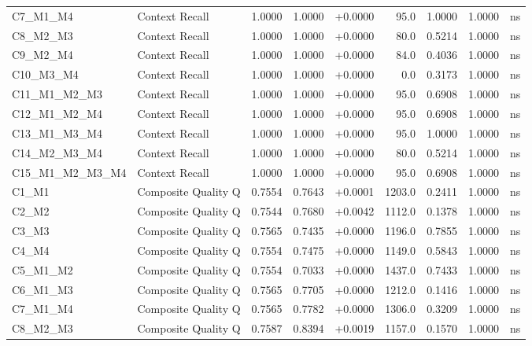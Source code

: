 \begin{table}[p]
\begin{tabular*}{\textwidth}{@{\extracolsep{\fill}} l l r r r r r r c @{}}
\addlinespace
C7\_M1\_M4      & Context Recall       & 1.0000 & 1.0000 & +0.0000 & 95.0 & 1.0000 & 1.0000 & ns \\
\addlinespace
C8\_M2\_M3      & Context Recall       & 1.0000 & 1.0000 & +0.0000 & 80.0 & 0.5214 & 1.0000 & ns \\
\addlinespace
C9\_M2\_M4      & Context Recall       & 1.0000 & 1.0000 & +0.0000 & 84.0 & 0.4036 & 1.0000 & ns \\
\addlinespace
C10\_M3\_M4     & Context Recall       & 1.0000 & 1.0000 & +0.0000 & 0.0 & 0.3173 & 1.0000 & ns \\
\addlinespace
C11\_M1\_M2\_M3 & Context Recall       & 1.0000 & 1.0000 & +0.0000 & 95.0 & 0.6908 & 1.0000 & ns \\
\addlinespace
C12\_M1\_M2\_M4 & Context Recall       & 1.0000 & 1.0000 & +0.0000 & 95.0 & 0.6908 & 1.0000 & ns \\
\addlinespace
C13\_M1\_M3\_M4 & Context Recall       & 1.0000 & 1.0000 & +0.0000 & 95.0 & 1.0000 & 1.0000 & ns \\
\addlinespace
C14\_M2\_M3\_M4 & Context Recall       & 1.0000 & 1.0000 & +0.0000 & 80.0 & 0.5214 & 1.0000 & ns \\
\addlinespace
C15\_M1\_M2\_M3\_M4 & Context Recall       & 1.0000 & 1.0000 & +0.0000 & 95.0 & 0.6908 & 1.0000 & ns \\
\addlinespace
C1\_M1          & Composite Quality Q  & 0.7554 & 0.7643 & +0.0001 & 1203.0 & 0.2411 & 1.0000 & ns \\
\addlinespace
C2\_M2          & Composite Quality Q  & 0.7544 & 0.7680 & +0.0042 & 1112.0 & 0.1378 & 1.0000 & ns \\
\addlinespace
C3\_M3          & Composite Quality Q  & 0.7565 & 0.7435 & +0.0000 & 1196.0 & 0.7855 & 1.0000 & ns \\
\addlinespace
C4\_M4          & Composite Quality Q  & 0.7554 & 0.7475 & +0.0000 & 1149.0 & 0.5843 & 1.0000 & ns \\
\addlinespace
C5\_M1\_M2      & Composite Quality Q  & 0.7554 & 0.7033 & +0.0000 & 1437.0 & 0.7433 & 1.0000 & ns \\
\addlinespace
C6\_M1\_M3      & Composite Quality Q  & 0.7565 & 0.7705 & +0.0000 & 1212.0 & 0.1416 & 1.0000 & ns \\
\addlinespace
C7\_M1\_M4      & Composite Quality Q  & 0.7565 & 0.7782 & +0.0000 & 1306.0 & 0.3209 & 1.0000 & ns \\
\addlinespace
C8\_M2\_M3      & Composite Quality Q  & 0.7587 & 0.8394 & +0.0019 & 1157.0 & 0.1570 & 1.0000 & ns \\

\end{tabular*}
\end{table}
